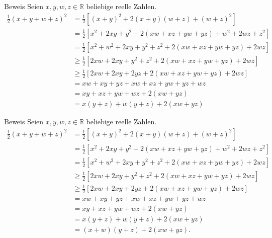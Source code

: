 \documentclass[10pt]{beamer}
\def\bR{\mathbb{R}}
\begin{document}
\begin{frame}{Beweis}
    Seien \( x, y, w, z \in \bR \) beliebige reelle Zahlen.
    \begin{align*}
        \frac{1}{2} \left( x + y + w + z \right)^{2}
        & = \frac{1}{2} \left[ \left( x + y \right)^{2} + 2 \left( x + y \right)\left( w + z \right) + \left( w + z \right)^{2} \right] \\
        & = \frac{1}{2} \left[ x^{2} + 2xy + y^{2} + 2 \left( xw + xz + yw + yz \right) + w^{2} + 2wz + z^{2} \right] \\
        & = \frac{1}{2} \left[ x^{2} + w^{2} + 2xy + y^{2} + z^{2} + 2 \left( xw + xz + yw + yz \right)  + 2wz \right] \\
        & \geq \frac{1}{2} \left[ 2xw + 2xy + y^{2} + z^{2} + 2 \left( xw + xz + yw + yz \right)  + 2wz \right] \\
        & \geq \frac{1}{2} \left[ 2xw + 2xy + 2yz + 2 \left( xw + xz + yw + yz \right)  + 2wz \right] \\
        & = xw + xy + yz + xw + xz + yw + yz + wz \\
        & = xy + xz + yw + wz + 2 \left( xw + yz \right) \\
        & = x \left( y + z \right) + w \left( y + z \right) + 2 \left( xw + yz \right)
    \end{align*}
\end{frame}



\begin{frame}{Beweis}
    Seien \( x, y, w, z \in \bR \) beliebige reelle Zahlen.
    \begin{align*}
        \frac{1}{2} \left( x + y + w + z \right)^{2}
        & = \frac{1}{2} \left[ \left( x + y \right)^{2} + 2 \left( x + y \right)\left( w + z \right) + \left( w + z \right)^{2} \right] \\
        & = \frac{1}{2} \left[ x^{2} + 2xy + y^{2} + 2 \left( xw + xz + yw + yz \right) + w^{2} + 2wz + z^{2} \right] \\
        & = \frac{1}{2} \left[ x^{2} + w^{2} + 2xy + y^{2} + z^{2} + 2 \left( xw + xz + yw + yz \right)  + 2wz \right] \\
        & \geq \frac{1}{2} \left[ 2xw + 2xy + y^{2} + z^{2} + 2 \left( xw + xz + yw + yz \right)  + 2wz \right] \\
        & \geq \frac{1}{2} \left[ 2xw + 2xy + 2yz + 2 \left( xw + xz + yw + yz \right)  + 2wz \right] \\
        & = xw + xy + yz + xw + xz + yw + yz + wz \\
        & = xy + xz + yw + wz + 2 \left( xw + yz \right) \\
        & = x \left( y + z \right) + w \left( y + z \right) + 2 \left( xw + yz \right) \\
        & = \left( x + w \right) \left( y + z \right) + 2 \left( xw + yz \right).
    \end{align*}
\end{frame}
\end{document}

